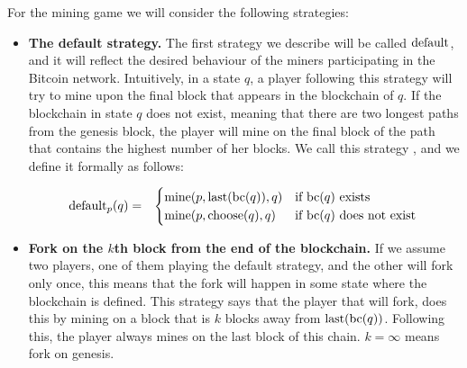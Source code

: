 For the mining game we will consider the following strategies:
\begin{itemize}
\item {\bf The default strategy.}  The first strategy we describe will be called $\text{\rm default}$, and it will reflect the desired behaviour of the miners participating in the Bitcoin network. Intuitively, in a state $q$, a player following this strategy will try to mine upon the final block that appears in the blockchain of $q$. If the blockchain in state $q$ does not exist, meaning that there are two longest paths from the genesis block, the player will mine on the final block of the path that contains the highest number of her blocks. We call this strategy \df, and we define it formally as follows:

\begin{eqnarray*}
\text{\rm default}_p(q) & = &
\begin{cases}
\text{\rm mine}(p,\text{\rm last}(\text{bc}(q)),q) & \text{if } \text{bc}(q) \text{ exists }\\
\text{\rm mine}(p,\text{\rm choose}(q),q) & \text{if } \text{bc}(q) \text{ does not exist }
\end{cases}
\end{eqnarray*}


\item {\bf Fork on the $k$th block from the end of the blockchain.} If we assume two players, one of them playing the default strategy, and the other will fork only once, this means that the fork will happen in some state where the blockchain is defined. This strategy says that the player that will fork, does this by mining on a block that is $k$ blocks away from $\text{\rm last}(\text{bc}(q))$. Following this, the player always mines on the last block of this chain. $k=\infty$ means fork on genesis. 



\end{itemize}
